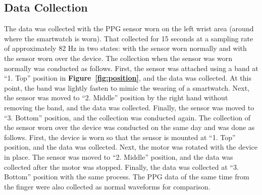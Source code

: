 \documentclass[sigconf, anonymous]{acmart}
\newcommand\figref[1]{\textbf{Figure~\ref{fig:#1}}}
\begin{document}
\subsection{Data Collection}
The data was collected with the PPG sensor worn on the left wrist area (around where the smartwatch is worn). That collected for 15 seconds at a sampling rate of approximately 82 Hz in two states: with the sensor worn normally and with the sensor worn over the device. The collection when the sensor was worn normally was conducted as follows. First, the sensor was attached using a band at ``1. Top'' position in \figref{position}, and the data was collected. At this point, the band was lightly fasten to mimic the wearing of a smartwatch. Next, the sensor was moved to ``2. Middle'' position by the right hand without removing the band, and the data was collected. Finally, the sensor was moved to ``3. Bottom'' position, and the collection was conducted again. The collection of the sensor worn over the device was conducted on the same day and was done as follows. First, the device is worn so that the sensor is mounted at ``1. Top'' position, and the data was collected. Next, the motor was rotated with the device in place. The sensor was moved to ``2. Middle'' position, and the data was collected after the motor was stopped. Finally, the data was collected at ``3. Bottom'' position with the same process. The PPG data of the same time from the finger were also collected as normal waveforms for comparison.
\end{document}
